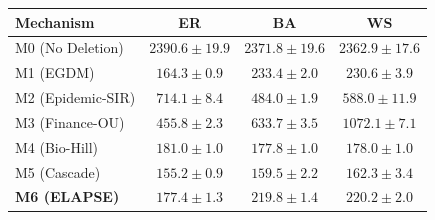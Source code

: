 \begin{tabular}{lccc}
  \toprule
  Mechanism & ER & BA & WS \\
  \midrule
  M0 (No Deletion) & $2390.6 \pm 19.9$ & $2371.8 \pm 19.6$ & $2362.9 \pm 17.6$ \\
  M1 (EGDM) & $164.3 \pm 0.9$ & $233.4 \pm 2.0$ & $230.6 \pm 3.9$ \\
  M2 (Epidemic-SIR) & $714.1 \pm 8.4$ & $484.0 \pm 1.9$ & $588.0 \pm 11.9$ \\
  M3 (Finance-OU) & $455.8 \pm 2.3$ & $633.7 \pm 3.5$ & $1072.1 \pm 7.1$ \\
  M4 (Bio-Hill) & $181.0 \pm 1.0$ & $177.8 \pm 1.0$ & $178.0 \pm 1.0$ \\
  M5 (Cascade) & $155.2 \pm 0.9$ & $159.5 \pm 2.2$ & $162.3 \pm 3.4$ \\
  \midrule
  \textbf{M6 (ELAPSE)} & \textbf{$177.4 \pm 1.3$} & \textbf{$219.8 \pm 1.4$} & \textbf{$220.2 \pm 2.0$} \\
  \bottomrule
\end{tabular}